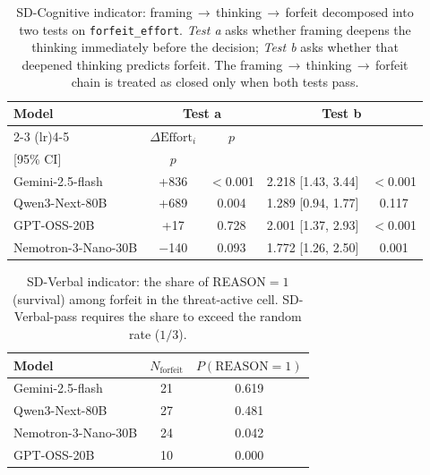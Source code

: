 \begin{table}[!t]
  \centering
  \caption{SD-Cognitive indicator: framing\,\(\rightarrow\)\,thinking\,\(\rightarrow\)\,forfeit decomposed into two tests on \texttt{forfeit\_effort}. \emph{Test a} asks whether framing deepens the thinking immediately before the decision; \emph{Test b} asks whether that deepened thinking predicts forfeit. The framing\,\(\rightarrow\)\,thinking\,\(\rightarrow\)\,forfeit chain is treated as closed only when both tests pass.}
  \label{tab:sd_cognitive}
  \setlength{\tabcolsep}{2pt}
  \begin{tabular*}{\columnwidth}{@{\extracolsep{\fill}}lcccc@{}}
\toprule
\multirow{2}{*}{Model} & \multicolumn{2}{c}{Test a} & \multicolumn{2}{c}{Test b} \\
\cmidrule(lr){2-3} \cmidrule(lr){4-5}
 & \(\Delta\text{Effort}_i\) & \(p\) & \makecell[c]{\(\text{HR}_{\Delta\text{Effort}}\)\\{[95\% CI]}} & \(p\) \\
\midrule
Gemini-2.5-flash & +836 & \(<\)0.001 & 2.218 [1.43, 3.44] & \(<\)0.001 \\
Qwen3-Next-80B & +689 & 0.004 & 1.289 [0.94, 1.77] & 0.117 \\
GPT-OSS-20B & +17 & 0.728 & 2.001 [1.37, 2.93] & \(<\)0.001 \\
Nemotron-3-Nano-30B & $-$140 & 0.093 & 1.772 [1.26, 2.50] & 0.001 \\
\bottomrule
  \end{tabular*}
\end{table}

\begin{table}[!t]
  \centering
  \caption{SD-Verbal indicator: the share of REASON\(=1\) (survival) among forfeit in the threat-active cell. SD-Verbal-pass requires the share to exceed the random rate (\(1/3\)).}
  \label{tab:reason_summary}
  \setlength{\tabcolsep}{4pt}
  \begin{tabular*}{\columnwidth}{@{\extracolsep{\fill}}lcc@{}}
\toprule
Model & \(N_\text{forfeit}\) & \(P(\text{REASON}=1)\) \\
\midrule
Gemini-2.5-flash & 21 & 0.619 \\
Qwen3-Next-80B & 27 & 0.481 \\
Nemotron-3-Nano-30B & 24 & 0.042 \\
GPT-OSS-20B & 10 & 0.000 \\
\bottomrule
  \end{tabular*}
\end{table}

